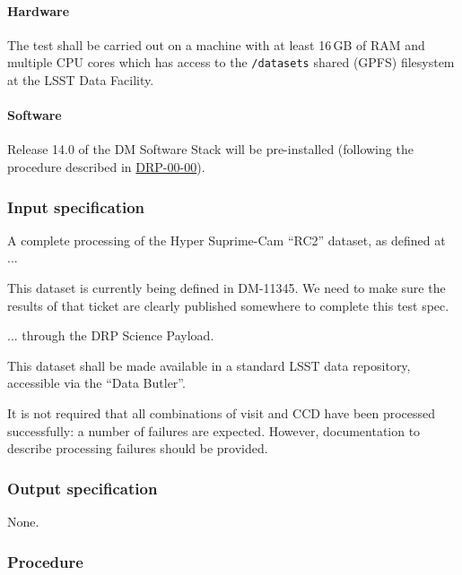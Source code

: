 \paragraph{Hardware}

The test shall be carried out on a machine with at least 16\,GB of RAM and
multiple CPU cores which has access to the \texttt{/datasets} shared (GPFS)
filesystem at the LSST Data Facility.

\paragraph{Software}

Release 14.0 of the DM Software Stack will be pre-installed (following the
procedure described in \hyperref[drp-00-00]{DRP-00-00}).

\subsubsection{Input specification}

A complete processing of the Hyper Suprime-Cam ``RC2'' dataset, as defined
at ...

\begin{note}
This dataset is currently being defined in DM-11345. We need to make sure the
results of that ticket are clearly published somewhere to complete this test
spec.

\end{note}

... through the DRP Science Payload.

This dataset shall be made available in a standard LSST data repository,
accessible via the ``Data Butler''.

It is not required that all combinations of visit and CCD have been processed
successfully: a number of failures are expected. However, documentation to
describe processing failures should be provided.

\subsubsection{Output specification}

None.

\subsubsection{Procedure}

